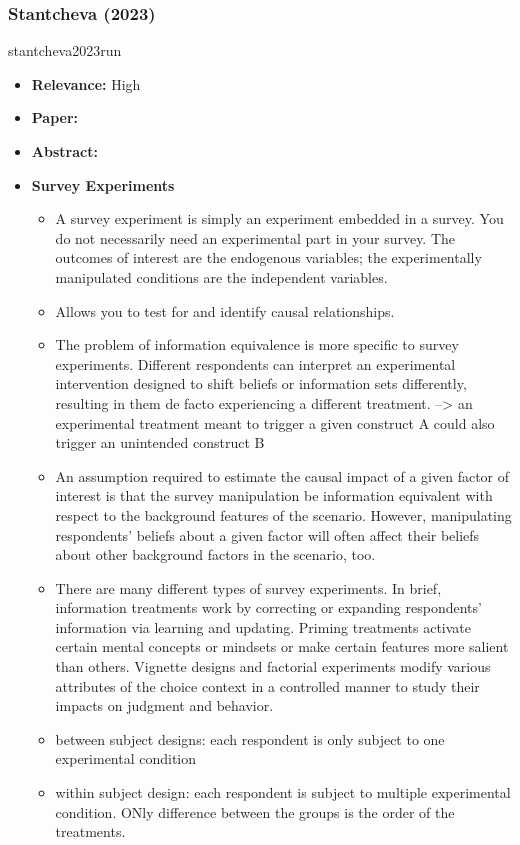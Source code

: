 \documentclass[a4paper, 12pt]{article}
\begin{document}
\subsubsection*{Stantcheva (2023)} stantcheva2023run
\begin{itemize}
    \item \textbf{Relevance:} High
    \item \textbf{Paper:} 
    \item \textbf{Abstract:} 
    \item \textbf{Survey Experiments}
    \begin{itemize}
        \item A survey experiment is simply an experiment embedded in a survey. You do not necessarily need an experimental part in your survey. The outcomes of interest are the endogenous variables; the experimentally manipulated conditions are the independent variables.
        \item Allows you to test for and identify causal relationships.
        \item The problem of information equivalence is more specific to survey experiments. Different respondents can interpret an experimental intervention designed to shift beliefs or information sets differently, resulting in them de facto experiencing a different treatment. --> an experimental treatment meant to trigger a given construct A could also trigger an unintended construct B
        \item An assumption required to estimate the causal impact of a given factor of interest is that the survey manipulation be information equivalent with respect to the background features of the scenario. However, manipulating respondents’ beliefs about a given factor will often affect their beliefs about other background factors in the scenario, too.
        \item There are many different types of survey experiments. In brief, information treatments work by correcting or expanding respondents’ information via learning and updating. Priming treatments activate certain mental concepts or mindsets or make certain features more salient than others. Vignette designs and factorial experiments modify various attributes of the choice context in a controlled manner to study their impacts on judgment and behavior.
        \item between subject designs: each respondent is only subject to one experimental condition
        \item within subject design: each respondent is subject to multiple experimental condition. ONly difference between the groups is the order of the treatments.

\end{itemize}
\end{itemize}
\end{document}
